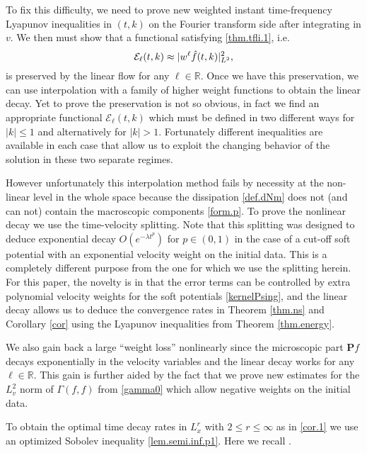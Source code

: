 \documentclass{amsart}
\numberwithin{equation}{section}
\begin{document}
To fix this difficulty, we need to prove new weighted instant time-frequency Lyapunov inequalities in $(t,k)$ on the Fourier transform side after integrating in ${v}$.  We then must show that a functional satisfying \eqref{thm.tfli.1}, i.e.
\begin{equation}\notag
    {\mathcal{E}}_{\ell}(t,k) \approx {|} w^\ell \hat{f}(t,k){|}_{L^2}^2,
\end{equation}
is preserved by the linear flow for any ${\ell}\in{\mathbb{R}}$.  Once we have this preservation, we can use interpolation with a family of higher weight functions to obtain the linear decay.   Yet to prove the preservation is not so obvious, in fact we find an appropriate functional ${\mathcal{E}}_{\ell}(t,k)$ which must be defined in two different ways for $|k| \le 1$ and alternatively for $|k| >1$.  Fortunately different inequalities are available in each case that allow us to exploit the changing behavior of the solution in these two separate regimes.

However unfortunately this interpolation method fails by necessity at the non-linear level in the whole space because the dissipation \eqref{def.dNm} does not (and can not) contain the macroscopic components \eqref{form.p}.   To prove the nonlinear decay we use the time-velocity splitting.  Note that this splitting was designed to deduce exponential decay $O(e^{-{\lambda} t^p})$ for $p\in (0,1)$ in the case of a cut-off soft potential \cite{MR2366140} with an exponential velocity weight on the initial data.  This is a completely different purpose from the one for which we use the splitting herein.    For this paper, the novelty is in that the error terms can be controlled by extra polynomial velocity weights for the soft potentials \eqref{kernelPsing}, and the linear decay allows us to deduce the convergence rates in Theorem \ref{thm.ns} and Corollary \ref{cor} using the Lyapunov inequalities from Theorem \ref{thm.energy}.  

We also gain back a large ``weight loss'' nonlinearly since the microscopic part ${\mathbf{P}} {f}$ decays exponentially in the velocity variables and the linear decay works for any ${\ell} \in {\mathbb{R}}$.  This gain is further aided by the fact that we prove new estimates for the $L^2_v$ norm of ${\Gamma}({f}, {f})$ from \eqref{gamma0} which allow negative weights on the initial data.  

To obtain the optimal time decay rates in $L^r_x$ with $2\le r \le \infty$ as in \eqref{cor.1}  we use  an optimized Sobolev inequality \eqref{lem.semi.inf.p1}.  Here we recall \cite{2010arXiv1006.3605D}.
\end{document}
